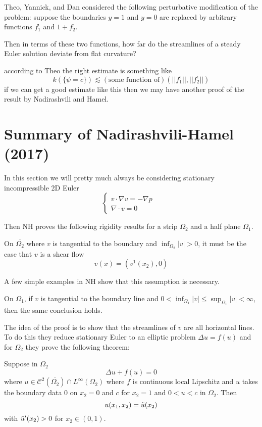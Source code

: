 Theo, Yannick, and Dan considered the following perturbative modification of the problem: suppose the boundaries $y = 1$ and $y = 0$ are replaced by arbitrary functions $f_1^\epsilon$ and $1 + f_2^\epsilon$.

Then in terms of these two functions, how far do the streamlines of a steady Euler solution deviate from flat curvature?

according to Theo the right estimate is something like
\[k(\{\psi = c\}) \lesssim (\text{some function of})(||f_1^\epsilon||, ||f_2^\epsilon||)\]
if we can get a good estimate like this then we may have another proof of the result by Nadirashvili and Hamel.

\section{Summary of Nadirashvili-Hamel (2017)}

In this section we will pretty much always be considering stationary incompressible 2D Euler 
\[\begin{cases}
    v \cdot \nabla v = -\nabla p & \\
    \nabla \cdot v = 0 & 
\end{cases}\]

Then NH proves the following rigidity results for a strip $\Omega_2$ and a half plane $\Omega_1$.

\begin{theorem}
    On $\overline{\Omega_2}$ where $v$ is tangential to the boundary and $\inf_{\Omega_2}|v| > 0$, it must be the case that $v$ is a shear flow
    \[v(x) = (v^1(x_2), 0)\]
\end{theorem}
A few simple examples in NH show that this assumption is necessary.

\begin{theorem}
    On $\Omega_1$, if $v$ is tangential to the boundary line and $0 < \inf_{\Omega_1}|v| \leq \sup_{\Omega_1}|v| < \infty$, then the same conclusion holds.
\end{theorem}
The idea of the proof is to show that the streamlines of $v$ are all horizontal lines. To do this they reduce stationary Euler to an elliptic problem $\Delta u = f(u)$ and for $\Omega_2$ they prove the following theorem:

\begin{theorem}
    Suppose in $\Omega_2$ 
    \[\Delta u + f(u) = 0\] where $u \in \mathcal{C}^2(\overline{\Omega_2}) \cap L^\infty(\Omega_2)$ where $f$ is continuous local Lipschitz and $u$ takes the boundary data $0$ on $x_2 = 0$ and $c$ for $x_2 = 1$ and $0 < u < c$ in $\Omega_2$. Then
    \[u(x_1, x_2) = \Tilde{u}(x_2)\] with $\Tilde{u}'(x_2) > 0$ for $x_2 \in (0, 1)$.
\end{theorem}

